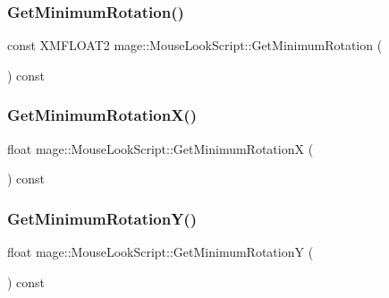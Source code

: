 \hypertarget{classmage_1_1_mouse_look_script_aa0ee621d5f42580f45a324ce856f2c82}{}\label{classmage_1_1_mouse_look_script_aa0ee621d5f42580f45a324ce856f2c82} 
\subsubsection{\texorpdfstring{Get\+Minimum\+Rotation()}{GetMinimumRotation()}}
{\footnotesize\ttfamily const X\+M\+F\+L\+O\+A\+T2 mage\+::\+Mouse\+Look\+Script\+::\+Get\+Minimum\+Rotation (\begin{DoxyParamCaption}{ }\end{DoxyParamCaption}) const}

\hypertarget{classmage_1_1_mouse_look_script_a6e1369c198e1d462f6fd30693f190d86}{}\label{classmage_1_1_mouse_look_script_a6e1369c198e1d462f6fd30693f190d86} 
\subsubsection{\texorpdfstring{Get\+Minimum\+Rotation\+X()}{GetMinimumRotationX()}}
{\footnotesize\ttfamily float mage\+::\+Mouse\+Look\+Script\+::\+Get\+Minimum\+RotationX (\begin{DoxyParamCaption}{ }\end{DoxyParamCaption}) const}

\hypertarget{classmage_1_1_mouse_look_script_a31f85ac897e436ebfff3d709b58eb435}{}\label{classmage_1_1_mouse_look_script_a31f85ac897e436ebfff3d709b58eb435} 
\subsubsection{\texorpdfstring{Get\+Minimum\+Rotation\+Y()}{GetMinimumRotationY()}}
{\footnotesize\ttfamily float mage\+::\+Mouse\+Look\+Script\+::\+Get\+Minimum\+RotationY (\begin{DoxyParamCaption}{ }\end{DoxyParamCaption}) const}

